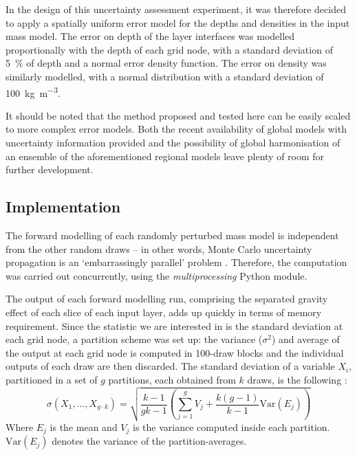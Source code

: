 In the design of this uncertainty assessment experiment, it was therefore decided to apply a spatially uniform error model for the depths and densities in the input mass model.
The error on depth of the layer interfaces was modelled proportionally with the depth of each grid node, with a standard deviation of \SI{5}{\percent} of depth and a normal error density function.
The error on density was similarly modelled, with a normal distribution with a standard deviation of \SI{100}{\kilo \gram \per \cubic \metre}.


It should be noted that the method proposed and tested here can be easily scaled to more complex error models.
Both the recent availability of global models with uncertainty information provided \parencite[e.g.][]{Szwillus2019} and the possibility of global harmonisation of an ensemble of the aforementioned regional models leave plenty of room for further development.

\subsection{Implementation}
\label{ss:SigIs:Impl:Impl}

The forward modelling of each randomly perturbed mass model is independent from the other random draws -- in other words, Monte Carlo uncertainty propagation is an `embarrassingly parallel' problem \parencite[see e.g.][chapter 15]{Kontoghiorghes2005}.
Therefore, the computation was carried out concurrently, using the \textit{multiprocessing} Python module.

The output of each forward modelling run, comprising the separated gravity effect of each slice of each input layer, adds up quickly in terms of memory requirement.
Since the statistic we are interested in is the standard deviation at each grid node, a partition scheme was set up: the variance ($\sigma^2$) and average of the output at each grid node is computed in \num{100}-draw blocks and the individual outputs of each draw are then discarded.
The standard deviation of a variable $X_i$, partitioned in a set of $g$ partitions, each obtained from $k$ draws, is the following \parencites{Chan1982}{Pebay2008}:
\begin{equation}
    \label{eq:StdAggregation}
    \sigma(X_1,\dots,X_{g \cdot k}) =
    \sqrt{
        \frac{k-1}{gk-1}
        \left(
            \sum_{j=1}^{g} V_j + \frac{k(g-1)}{k-1} \mathrm{Var}(E_j)
        \right)
    }
\end{equation}
Where $E_j$ is the mean and $V_j$ is the variance computed inside each partition.
$\mathrm{Var}(E_j)$ denotes the variance of the partition-averages.

